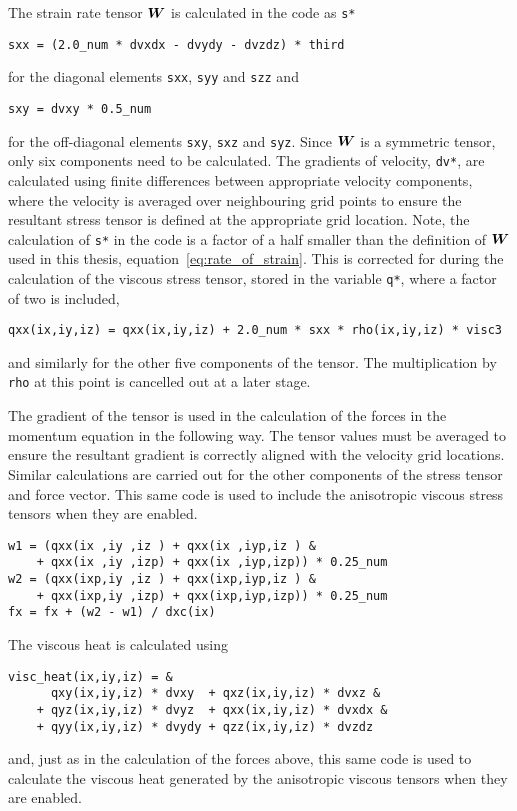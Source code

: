 The strain rate tensor ${\bm W}$ is calculated in the code as \verb|s*|
\begin{verbatim}
sxx = (2.0_num * dvxdx - dvydy - dvzdz) * third
\end{verbatim}
for the diagonal elements \verb|sxx|, \verb|syy| and \verb|szz| and
\begin{verbatim}
sxy = dvxy * 0.5_num
\end{verbatim}
for the off-diagonal elements \verb|sxy|, \verb|sxz| and \verb|syz|. Since ${\bm W}$ is a symmetric tensor, only six components need to be calculated. The gradients of velocity, \verb|dv*|, are calculated using finite differences between appropriate velocity components, where the velocity is averaged over neighbouring grid points to ensure the resultant stress tensor is defined at the appropriate grid location. Note, the calculation of \verb|s*| in the code is a factor of a half smaller than the definition of ${\bm W}$ used in this thesis, equation~\eqref{eq:rate_of_strain}. This is corrected for during the calculation of the viscous stress tensor, stored in the variable \verb|q*|, where a factor of two is included,
\begin{verbatim}
qxx(ix,iy,iz) = qxx(ix,iy,iz) + 2.0_num * sxx * rho(ix,iy,iz) * visc3
\end{verbatim}
and similarly for the other five components of the tensor. The multiplication by \verb|rho| at this point is cancelled out at a later stage.

The gradient of the tensor is used in the calculation of the forces in the momentum equation in the following way. The tensor values must be averaged to ensure the resultant gradient is correctly aligned with the velocity grid locations. Similar calculations are carried out for the other components of the stress tensor and force vector. This same code is used to include the anisotropic viscous stress tensors when they are enabled.
\begin{verbatim}
w1 = (qxx(ix ,iy ,iz ) + qxx(ix ,iyp,iz ) &
    + qxx(ix ,iy ,izp) + qxx(ix ,iyp,izp)) * 0.25_num
w2 = (qxx(ixp,iy ,iz ) + qxx(ixp,iyp,iz ) &
    + qxx(ixp,iy ,izp) + qxx(ixp,iyp,izp)) * 0.25_num
fx = fx + (w2 - w1) / dxc(ix)
\end{verbatim}

The viscous heat is calculated using
\begin{verbatim}
visc_heat(ix,iy,iz) = &
      qxy(ix,iy,iz) * dvxy  + qxz(ix,iy,iz) * dvxz &
    + qyz(ix,iy,iz) * dvyz  + qxx(ix,iy,iz) * dvxdx &
    + qyy(ix,iy,iz) * dvydy + qzz(ix,iy,iz) * dvzdz
\end{verbatim}
and, just as in the calculation of the forces above, this same code is used to calculate the viscous heat generated by the anisotropic viscous tensors when they are enabled.

